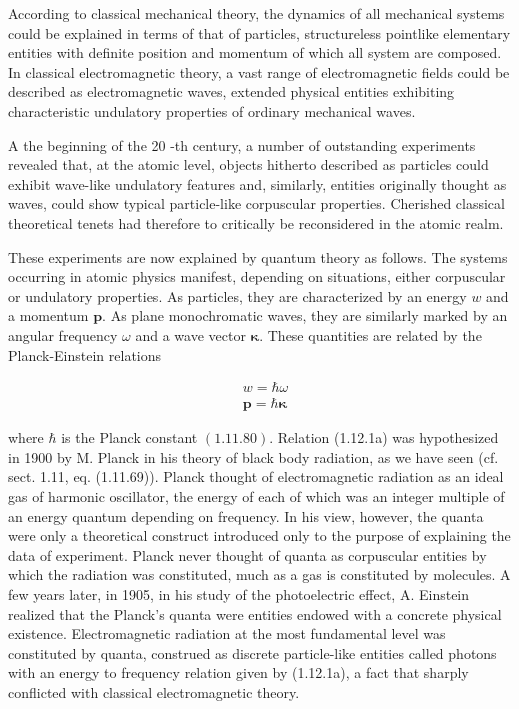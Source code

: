\documentclass{article}
\begin{document}
According to classical mechanical theory, the dynamics of all mechanical systems could be explained in terms of that of particles, structureless pointlike elementary entities with definite position and momentum of which all system are composed. In classical electromagnetic theory, a vast range of electromagnetic fields could be described as electromagnetic waves, extended physical entities exhibiting characteristic undulatory properties of ordinary mechanical waves.

A the beginning of the 20 -th century, a number of outstanding experiments revealed that, at the atomic level, objects hitherto described as particles could exhibit wave-like undulatory features and, similarly, entities originally thought as waves, could show typical particle-like corpuscular properties. Cherished classical theoretical tenets had therefore to critically be reconsidered in the atomic realm.

These experiments are now explained by quantum theory as follows. The systems occurring in atomic physics manifest, depending on situations, either corpuscular or undulatory properties. As particles, they are characterized by an energy $w$ and a momentum $\boldsymbol{p}$. As plane monochromatic waves, they are similarly marked by an angular frequency $\omega$ and a wave vector $\boldsymbol{\kappa}$. These quantities are related by the Planck-Einstein relations
 
\begin{align*}
& w=\hbar \omega  \tag{1.12.1a}\\
& \boldsymbol{p}=\hbar \boldsymbol{\kappa} \tag{1.12.1b}
\end{align*}
 
where $\hbar$ is the Planck constant $(1.11 .80)$.
Relation (1.12.1a) was hypothesized in 1900 by M. Planck in his theory of black body radiation, as we have seen (cf. sect. 1.11, eq. (1.11.69)). Planck thought of electromagnetic radiation as an ideal gas of harmonic oscillator, the energy of each of which was an integer multiple of an energy quantum depending on frequency. In his view, however, the quanta were only a theoretical construct
introduced only to the purpose of explaining the data of experiment. Planck never thought of quanta as corpuscular entities by which the radiation was constituted, much as a gas is constituted by molecules. A few years later, in 1905, in his study of the photoelectric effect, A. Einstein realized that the Planck's quanta were entities endowed with a concrete physical existence. Electromagnetic radiation at the most fundamental level was constituted by quanta, construed as discrete particle-like entities called photons with an energy to frequency relation given by (1.12.1a), a fact that sharply conflicted with classical electromagnetic theory.
\end{document}
